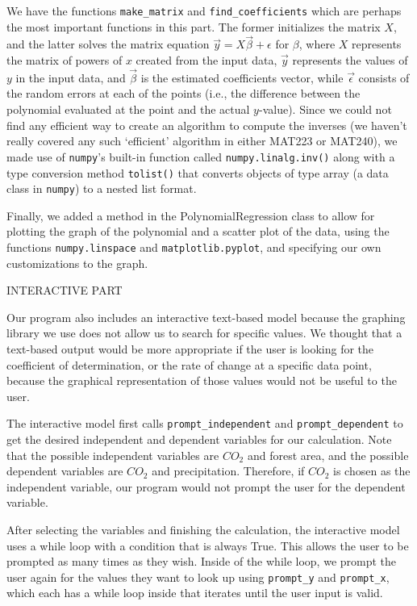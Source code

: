 \documentclass[12pt]{article}
\begin{document}
\begin{enumerate}
\begin{text}
We have the functions \texttt{make\_matrix} and \texttt{find\_coefficients} which are perhaps the most important functions in this part. The former initializes the matrix $X$, and the latter solves the matrix equation $\vec{y} = X\vec{\beta} + \epsilon$ for $\beta$, where $X$ represents the matrix of powers of $x$ created from the input data, $\vec{y}$ represents the values of $y$ in the input data, and $\vec{\beta}$ is the estimated coefficients vector, while $\vec{\epsilon}$ consists of the random errors at each of the points (i.e., the difference between the polynomial evaluated at the point and the actual $y$-value). Since we could not find any efficient way to create an algorithm to compute the inverses (we haven't really covered any such `efficient' algorithm in either MAT223 or MAT240), we made use of \texttt{numpy}'s built-in function called \texttt{numpy.linalg.inv()} along with a type conversion method \texttt{tolist()} that converts objects of type array (a data class in \texttt{numpy}) to a nested list format.

Finally, we added a method in the PolynomialRegression class to allow for plotting the graph of the polynomial and a scatter plot of the data, using the functions \texttt{numpy.linspace} and \texttt{matplotlib.pyplot}, and specifying our own customizations to the graph.

INTERACTIVE PART

Our program also includes an interactive text-based model because the graphing library we use does not allow us to search for specific values. We thought that a text-based output would be more appropriate if the user is looking for the coefficient of determination, or the rate of change at a specific data point, because the graphical representation of those values would not be useful to the user.

The interactive model first calls \texttt{prompt\_independent} and \texttt{prompt\_dependent} to get the desired independent and dependent variables for our calculation. Note that the possible independent variables are $CO_2$ and forest area, and the possible dependent variables are $CO_2$ and precipitation. Therefore, if $CO_2$ is chosen as the independent variable, our program would not prompt the user for the dependent variable.

After selecting the variables and finishing the calculation, the interactive model uses a while loop with a condition that is always True. This allows the user to be prompted as many times as they wish. Inside of the while loop, we prompt the user again for the values they want to look up using \texttt{prompt\_y} and \texttt{prompt\_x}, which each has a while loop inside that iterates until the user input is valid.


\end{text}
\end{enumerate}
\end{document}
